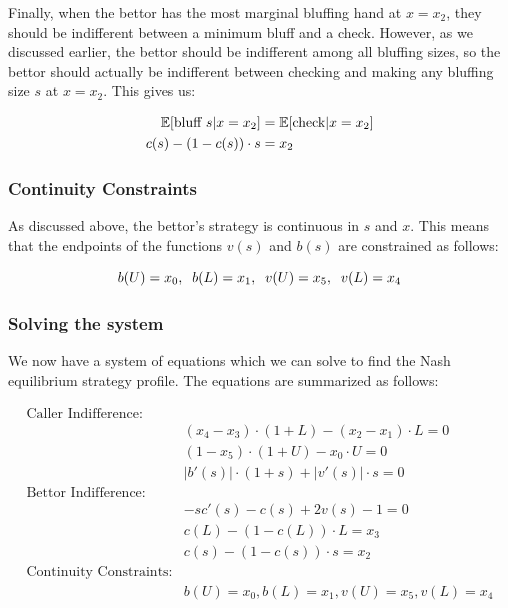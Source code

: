 \documentclass[a4paper,12pt]{article}
\theoremstyle{plain}
\theoremstyle{definition}
\begin{document}
Finally, when the bettor has the most marginal bluffing hand at $x=x_2$, they should be indifferent between a minimum bluff and a check. However, as we discussed earlier, the bettor should be indifferent among all bluffing sizes, so the bettor should actually be indifferent between checking and making any bluffing size $s$ at $x=x_2$. This gives us:

\begin{align}{\label{bluffindiff}}
    \nonumber \mathbb{E}[\text{bluff } s | x=x_2] & = \mathbb{E}[\text{check} | x=x_2]\\ 
    c(s) - (1-c(s)) \cdot s & = x_2
\end{align}


\subsubsection{Continuity Constraints}

As discussed above, the bettor's strategy is continuous in $s$ and $x$. This means that the endpoints of the functions $v(s)$ and $b(s)$ are constrained as follows:

\begin{equation}{\label{continuityconstraints}}
	 b(U) = x_0, \;\; b(L) = x_1, \;\; v(U) = x_5, \;\; v(L) = x_4
\end{equation}

\subsubsection{Solving the system}
We now have a system of equations which we can solve to find the Nash equilibrium strategy profile. The equations are summarized as follows:

\begin{align*}
    \text{Caller Indifference:} & \\
    & (x_4-x_3) \cdot (1+L) - (x_2-x_1) \cdot L = 0\\
    & (1-x_5) \cdot (1+U) - x_0 \cdot U = 0\\
    & |b'(s)| \cdot (1 + s) + |v'(s)| \cdot s = 0\\
    \text{Bettor Indifference:} & \\
    & -sc'(s) - c(s) + 2 v(s) - 1 = 0\\
    & c(L) - (1-c(L)) \cdot L = x_3\\
    & c(s) - (1-c(s)) \cdot s = x_2\\
    \text{Continuity Constraints:} & \\
    & b(U) = x_0, b(L) = x_1, v(U) = x_5, v(L) = x_4
\end{align*}
\end{document}
